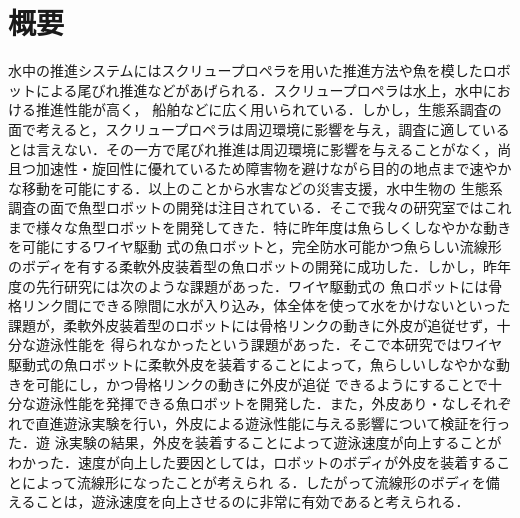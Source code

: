 \newpage
\section*{概要}
水中の推進システムにはスクリュープロペラを用いた推進方法や魚を模したロボットによる尾びれ推進などがあげられる．スクリュープロペラは水上，水中における推進性能が高く，
船舶などに広く用いられている．しかし，生態系調査の面で考えると，スクリュープロペラは周辺環境に影響を与え，調査に適しているとは言えない．その一方で尾びれ推進は周辺環境に影響を与えることがなく，尚且つ加速性・旋回性に優れているため障害物を避けながら目的の地点まで速やかな移動を可能にする．以上のことから水害などの災害支援，水中生物の
生態系調査の面で魚型ロボットの開発は注目されている．そこで我々の研究室ではこれまで様々な魚型ロボットを開発してきた．特に昨年度は魚らしくしなやかな動きを可能にするワイヤ駆動
式の魚ロボットと，完全防水可能かつ魚らしい流線形のボディを有する柔軟外皮装着型の魚ロボットの開発に成功した．しかし，昨年度の先行研究には次のような課題があった．ワイヤ駆動式の
魚ロボットには骨格リンク間にできる隙間に水が入り込み，体全体を使って水をかけないといった課題が，柔軟外皮装着型のロボットには骨格リンクの動きに外皮が追従せず，十分な遊泳性能を
得られなかったという課題があった．そこで本研究ではワイヤ駆動式の魚ロボットに柔軟外皮を装着することによって，魚らしいしなやかな動きを可能にし，かつ骨格リンクの動きに外皮が追従
できるようにすることで十分な遊泳性能を発揮できる魚ロボットを開発した．また，外皮あり・なしそれぞれで直進遊泳実験を行い，外皮による遊泳性能に与える影響について検証を行った．遊
泳実験の結果，外皮を装着することによって遊泳速度が向上することがわかった．速度が向上した要因としては，ロボットのボディが外皮を装着することによって流線形になったことが考えられ
る．したがって流線形のボディを備えることは，遊泳速度を向上させるのに非常に有効であると考えられる．
\newpage
